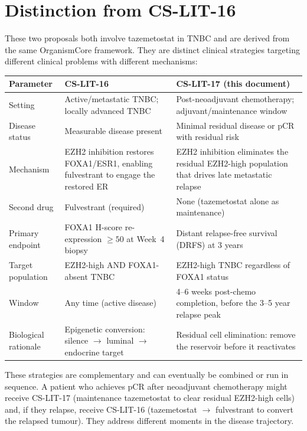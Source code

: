 \documentclass[12pt, a4paper]{article}
\begin{document}
\section{Distinction from CS-LIT-16}

These two proposals both involve tazemetostat in TNBC
and are derived from the same OrganismCore framework.
They are distinct clinical strategies targeting
different clinical problems with different mechanisms:

\begin{center}
\begin{tabular}{p{3.5cm}p{5cm}p{5cm}}
\toprule
\textbf{Parameter}
& \textbf{CS-LIT-16}
& \textbf{CS-LIT-17 (this document)} \\
\midrule
Setting
& Active/metastatic TNBC;
  locally advanced TNBC
& Post-neoadjuvant chemotherapy;
  adjuvant/maintenance window \\[0.4em]
Disease status
& Measurable disease present
& Minimal residual disease or
  pCR with residual risk \\[0.4em]
Mechanism
& EZH2 inhibition restores
  FOXA1/ESR1, enabling
  fulvestrant to engage the
  restored ER
& EZH2 inhibition eliminates
  the residual EZH2-high
  population that drives
  late metastatic relapse \\[0.4em]
Second drug
& Fulvestrant (required)
& None (tazemetostat alone
  as maintenance) \\[0.4em]
Primary endpoint
& FOXA1 H-score
  re-expression $\geq50$
  at Week~4 biopsy
& Distant relapse-free
  survival (DRFS) at 3 years \\[0.4em]
Target population
& EZH2-high AND
  FOXA1-absent TNBC
& EZH2-high TNBC regardless
  of FOXA1 status \\[0.4em]
Window
& Any time (active disease)
& 4--6 weeks post-chemo
  completion, before the
  3--5 year relapse peak \\[0.4em]
Biological rationale
& Epigenetic conversion:
  silence $\rightarrow$ luminal
  $\rightarrow$ endocrine target
& Residual cell elimination:
  remove the reservoir before
  it reactivates \\
\bottomrule
\end{tabular}
\end{center}

\noindent These strategies are complementary and can
eventually be combined or run in sequence. A patient
who achieves pCR after neoadjuvant chemotherapy might
receive CS-LIT-17 (maintenance tazemetostat to clear
residual EZH2-high cells) and, if they relapse, receive
CS-LIT-16 (tazemetostat $\rightarrow$ fulvestrant to
convert the relapsed tumour). They address different
moments in the disease trajectory.
\end{document}
